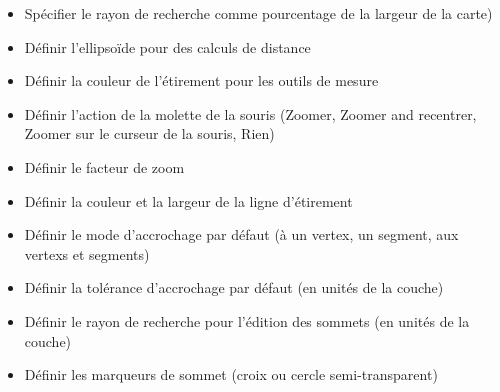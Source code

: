 %


\begin{itemize}
\item Spécifier le rayon de recherche comme pourcentage de la largeur de la carte)
\item Définir l'ellipsoïde pour des calculs de distance
\item Définir la couleur de l'étirement pour les outils de mesure
\item Définir l'action de la molette de la souris (Zoomer, Zoomer and recentrer, Zoomer sur le curseur de la souris, Rien)
\item Définir le facteur de zoom
\end{itemize}

%


\begin{itemize}
\item Définir la couleur et la largeur de la ligne d'étirement
\item Définir le mode d'accrochage par défaut (à un vertex, un segment, aux vertexs et segments)
\item Définir la tolérance d'accrochage par défaut (en unités de la couche) 
\item Définir le rayon de recherche pour l'édition des sommets (en unités de la couche) 
\item Définir les marqueurs de sommet (croix ou cercle semi-transparent)
\end{itemize}

